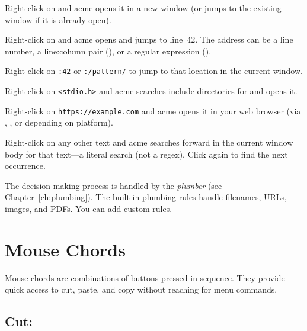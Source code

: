 \begin{description}[style=nextline]
\item[Filename]
Right-click on  and acme opens it in a new window (or
jumps to the existing window if it is already open).

\item[Filename with address]
Right-click on  and acme opens  and
jumps to line~42.  The address can be a line number, a line:column
pair (), or a regular expression
().

\item[Address in current file]
Right-click on \texttt{:42} or \texttt{:/pattern/} to jump to that
location in the current window.

\item[Include file]
Right-click on \texttt{<stdio.h>} and acme searches include
directories for  and opens it.

\item[URL]
Right-click on \texttt{https://example.com} and acme opens it in
your web browser (via , , or
 depending on platform).

\item[Plain text]
Right-click on any other text and acme searches forward in the
current window body for that text---a literal search (not a regex).
Click again to find the next occurrence.
\end{description}

The decision-making process is handled by the \emph{plumber} (see
Chapter~\ref{ch:plumbing}).  The built-in plumbing rules handle
filenames, URLs, images, and PDFs.  You can add custom rules.

\section{Mouse Chords}
\label{sec:chords}


Mouse chords are combinations of buttons pressed in sequence.  They
provide quick access to cut, paste, and copy without reaching for menu
commands.

\subsection{Cut: }

